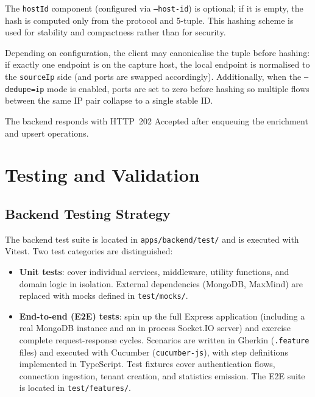 \documentclass[12pt]{report}
\begin{document}
The \texttt{hostId} component (configured via \texttt{--host-id}) is optional; if it is
empty, the hash is computed only from the protocol and 5-tuple. This hashing scheme is used
for stability and compactness rather than for security.

Depending on configuration, the client may canonicalise the tuple before hashing:
if exactly one endpoint is on the capture host, the local endpoint is normalised to the
\texttt{sourceIp} side (and ports are swapped accordingly). Additionally, when the
\texttt{--dedupe=ip} mode is enabled, ports are set to zero before hashing so multiple flows
between the same IP pair collapse to a single stable ID.

The backend responds with HTTP~202 Accepted after enqueuing the enrichment and upsert
operations.

\chapter{Testing and Validation}
\label{ch:testing}

\section{Backend Testing Strategy}

The backend test suite is located in \texttt{apps/backend/test/} and is executed with Vitest.
Two test categories are distinguished:

\begin{itemize}
    \item \textbf{Unit tests}: cover individual services, middleware, utility functions, and
          domain logic in isolation. External dependencies (MongoDB, MaxMind) are replaced
          with mocks defined in \texttt{test/mocks/}.
    \item \textbf{End-to-end (E2E) tests}: spin up the full Express application (including
          a real MongoDB instance and an in process Socket.IO server) and exercise complete
          request-response cycles. Scenarios are written in Gherkin (\texttt{.feature} files)
          and executed with Cucumber (\texttt{cucumber-js}), with step definitions implemented
          in TypeScript. Test fixtures cover authentication flows, connection
          ingestion, tenant creation, and statistics emission. The E2E suite is located in
          \texttt{test/features/}.
\end{itemize}
\end{document}
